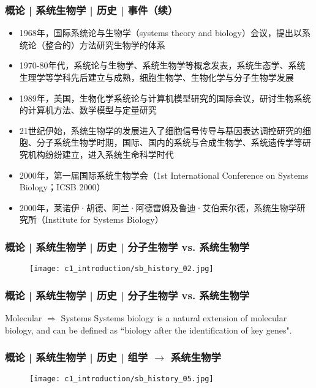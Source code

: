 \begin{frame}
  \frametitle{概论 | 系统生物学 | 历史 | 事件（续）}
  \begin{itemize}
    \item 1968年，国际系统论与生物学（systems theory and biology）会议，提出以系统论（整合的）方法研究生物学的体系
    \item 1970-80年代，系统论与生物学、系统生物学等概念发表，系统生态学、系统生理学等学科先后建立与成熟，细胞生物学、生物化学与分子生物学发展
    \item 1989年，美国，生物化学系统论与计算机模型研究的国际会议，研讨生物系统的计算机方法、数学模型与定量研究
    \item 21世纪伊始，系统生物学的发展进入了细胞信号传导与基因表达调控研究的细胞、分子系统生物学时期，国际、国内的系统与合成生物学、系统遗传学等研究机构纷纷建立，进入系统生命科学时代
    \item 2000年，第一届国际系统生物学会（1st International Conference on Systems Biology；ICSB 2000）
    \item 2000年，莱诺伊·胡德、阿兰·阿德雷姆及鲁迪·艾伯索尔德，系统生物学研究所（Institute for Systems Biology）
  \end{itemize}
\end{frame}

\begin{frame}
  \frametitle{概论 | 系统生物学 | 历史 | 分子生物学 vs. 系统生物学}
  \begin{figure}
    \centering
    \texttt{[image: c1\_introduction/sb\_history\_02.jpg]}
  \end{figure}
\end{frame}

\begin{frame}
  \frametitle{概论 | 系统生物学 | 历史 | 分子生物学 vs. 系统生物学}
  \begin{block}{Molecular $\Rightarrow$ Systems}
  Systems biology is a natural extension of molecular biology, and can be defined as ``biology after the identification of key genes".
  \end{block}
\end{frame}

\begin{frame}
  \frametitle{概论 | 系统生物学 | 历史 | 组学 $\rightarrow$ 系统生物学}
  \begin{figure}
    \centering
    \texttt{[image: c1\_introduction/sb\_history\_05.jpg]}
  \end{figure}
\end{frame}

